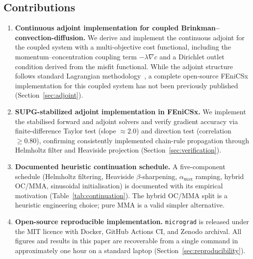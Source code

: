 \subsection*{Contributions}

\begin{enumerate}
    \item \textbf{Continuous adjoint implementation for coupled
          Brinkman--convection-diffusion.}
          We derive and implement the continuous adjoint for the
          coupled system with a multi-objective cost functional,
          including the momentum--concentration coupling term
          $-\lambda\nabla c$ and a Dirichlet outlet condition
          derived from the misfit functional.
          While the adjoint structure follows standard Lagrangian
          methodology~\cite{borrvall2003,othmer2008}, a complete
          open-source FEniCSx implementation for this coupled system
          has not been previously published
          (Section~\ref{sec:adjoint}).

    \item \textbf{SUPG-stabilized adjoint implementation in FEniCSx.}
          We implement the stabilised forward and adjoint solvers
          and verify gradient accuracy via finite-difference Taylor
          test (slope $\approx 2.0$) and direction test
          (correlation $\geq 0.80$), confirming consistently implemented
          chain-rule propagation through Helmholtz filter and
          Heaviside projection
          (Section~\ref{sec:verification}).

    \item \textbf{Documented heuristic continuation schedule.}
          A five-component schedule (Helmholtz filtering,
          Heaviside $\beta$-sharpening, $\alpha_{\max}$ ramping,
          hybrid OC/MMA, sinusoidal initialisation) is documented
          with its empirical motivation (Table~\ref{tab:continuation}).
          The hybrid OC/MMA split is a heuristic engineering choice;
          pure MMA is a valid simpler alternative.

    \item \textbf{Open-source reproducible implementation.}
          \texttt{micrograd} is released under the MIT licence
          with Docker, GitHub Actions CI, and Zenodo archival.
          All figures and results in this paper are recoverable
          from a single command in approximately one hour
          on a standard laptop
          (Section~\ref{sec:reproducibility}).
\end{enumerate}

